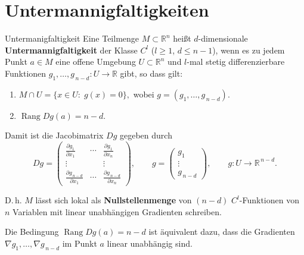 \newpage
\section{Untermannigfaltigkeiten}
\label{4.8}

\begin{definition}{Untermanigfaltigkeit}
    Eine Teilmenge $M\subset\mathbb{R}^n$ heißt $d$-dimensionale \textbf{Untermannigfaltigkeit} der Klasse $C^l$ ($l\ge 1$, $d\le n-1$), wenn es zu jedem Punkt $a\in M$ eine offene Umgebung $U\subset\mathbb{R}^n$ und $l$-mal stetig differenzierbare Funktionen $g_1,\dots,g_{\,n-d}:U\to\mathbb{R}$ gibt, so dass gilt:

    \begin{enumerate}
        \item[(a)] $M\cap U=\{x\in U:\;g(x)=0\},$ wobei $g=(g_1,\dots,g_{\,n-d})$.
        \item[(b)] $\operatorname{Rang}Dg(a)=n-d.$
    \end{enumerate}

    Damit ist die Jacobimatrix $Dg$ gegeben durch
    $$
    Dg=
    \begin{pmatrix}
        \displaystyle\frac{\partial g_1}{\partial x_1} & \cdots & \displaystyle\frac{\partial g_1}{\partial x_n}\\[6pt]
        \vdots & & \vdots\\[4pt]
        \displaystyle\frac{\partial g_{\,n-d}}{\partial x_1} & \cdots & \displaystyle\frac{\partial g_{\,n-d}}{\partial x_n}
    \end{pmatrix},
    \qquad
    g=
    \begin{pmatrix}
        g_1\\[2pt]
        \vdots\\[2pt]
        g_{\,n-d}
    \end{pmatrix},
    \qquad g:U\to\mathbb{R}^{\,n-d}.
    $$

    D.\,h. $M$ lässt sich lokal als \textbf{Nullstellenmenge} von $(n-d)$ $C^l$-Funktionen von $n$ Variablen mit linear unabhängigen Gradienten schreiben.

    Die Bedingung $\operatorname{Rang}Dg(a)=n-d$ ist äquivalent dazu, dass die Gradienten $\nabla g_1,\dots,\nabla g_{\,n-d}$ im Punkt $a$ linear unabhängig sind.
\end{definition}

